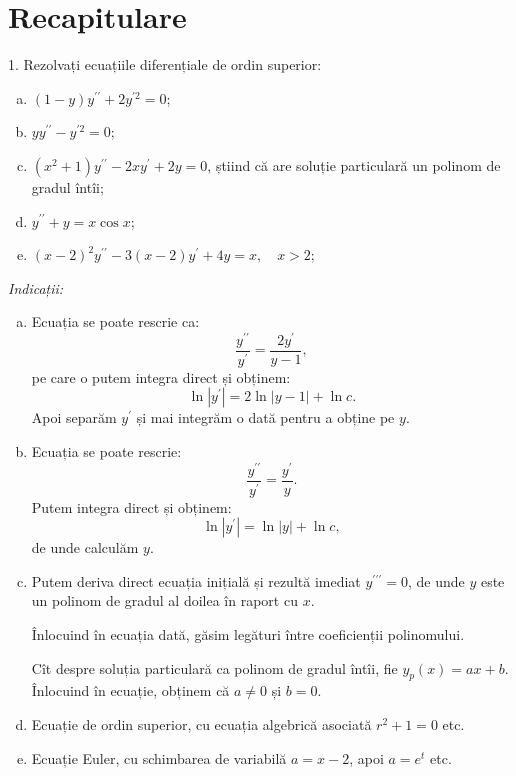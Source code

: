 
\chapter{Recapitulare}

1. Rezolvați ecuațiile diferențiale de ordin superior:
\begin{enumerate}[(a)]
\item $ (1 - y)y^{\prime\prime} + 2y^{\prime 2} = 0 $;
\item $ yy^{\prime\prime} - y^{\prime 2} = 0 $;
\item $ (x^2 + 1) y^{\prime\prime} - 2xy^{\prime} + 2y = 0 $, știind că are soluție
  particulară un polinom de gradul întîi;
\item $ y^{\prime\prime} + y = x \cos x $;
\item $ (x - 2)^2 y^{\prime\prime} - 3(x - 2) y^{\prime} + 4y = x, \quad x > 2 $;
\end{enumerate}

\emph{Indicații:}
\begin{enumerate}[(a)]
\item Ecuația se poate rescrie ca:
  \[
    \dfrac{y^{\prime\prime}}{y^\prime} = \dfrac{2y^\prime}{y-1},
  \]
  pe care o putem integra direct și obținem:
  \[
    \ln |y^\prime| = 2 \ln |y-1| + \ln c.
  \]
  Apoi separăm $ y^\prime $ și mai integrăm o dată pentru a obține pe $ y $.
\item Ecuația se poate rescrie:
  \[
    \dfrac{y^{\prime\prime}}{y^\prime} = \dfrac{y^\prime}{y}.
  \]
  Putem integra direct și obținem:
  \[
    \ln |y^\prime| = \ln |y| + \ln c,
  \]
  de unde calculăm $ y $.
\item Putem deriva direct ecuația inițială și rezultă imediat $ y^{\prime\prime\prime} = 0 $,
  de unde $ y $ este un polinom de gradul al doilea în raport cu $ x $.

  Înlocuind în ecuația dată, găsim legături între coeficienții polinomului.

  Cît despre soluția particulară ca polinom de gradul întîi, fie $ y_p(x) = ax + b $.
  Înlocuind în ecuație, obținem că $ a \neq 0 $ și $ b = 0 $.
\item Ecuație de ordin superior, cu ecuația algebrică asociată $ r^2 + 1 = 0 $ etc.
\item Ecuație Euler, cu schimbarea de variabilă $ a = x - 2 $, apoi $ a = e^t $ etc.
\end{enumerate}

\vspace{1cm}

